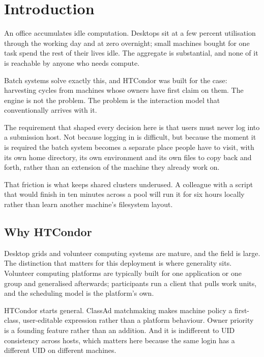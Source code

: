 \section{Introduction}
\label{sec:intro}

An office accumulates idle computation. Desktops sit at a few percent
utilisation through the working day and at zero overnight; small machines bought
for one task spend the rest of their lives idle. The aggregate is substantial,
and none of it is reachable by anyone who needs compute.

Batch systems solve exactly this, and HTCondor was built for the case: harvesting
cycles from machines whose owners have first claim on them. The engine is not the
problem. The problem is the interaction model that conventionally arrives with
it.

\begin{keypoint}
The requirement that shaped every decision here is that users must never log
into a submission host. Not because logging in is difficult, but because the
moment it is required the batch system becomes a separate place people have to
visit, with its own home directory, its own environment and its own files to
copy back and forth, rather than an extension of the machine they already work
on.
\end{keypoint}

That friction is what keeps shared clusters underused. A colleague with a script
that would finish in ten minutes across a pool will run it for six hours locally
rather than learn another machine's filesystem layout.

\subsection{Why HTCondor}

Desktop grids and volunteer computing systems are mature, and the field is
large. The distinction that matters for this deployment is where generality
sits. Volunteer computing platforms are typically built for one application or
one group and generalised afterwards; participants run a client that pulls work
units, and the scheduling model is the platform's own.

HTCondor starts general. ClassAd matchmaking makes machine policy a first-class,
user-editable expression rather than a platform behaviour. Owner priority is a
founding feature rather than an addition. And it is indifferent to UID
consistency across hosts, which matters here because the same login has a
different UID on different machines.

